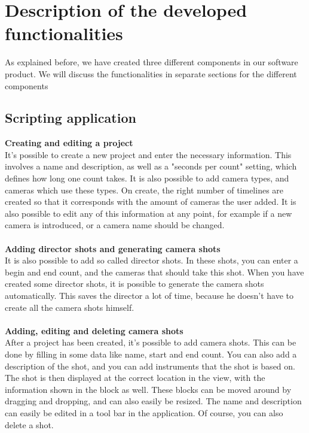 \section{Description of the developed functionalities}

As explained before, we have created three different components in our software product. We will discuss the functionalities in separate sections for the different components

\subsection{Scripting application}
\textbf{Creating and editing a project}\\
It's possible to create a new project and enter the necessary information. This involves a name and description, as well as a "seconds per count" setting, which defines how long one count takes. It is also possible to add camera types, and cameras which use these types. On create, the right number of timelines are created so that it corresponds with the amount of cameras the user added. It is also possible to edit any of this information at any point, for example if a new camera is introduced, or a camera name should be changed.\\\\
\textbf{Adding director shots and generating camera shots}\\
It is also possible to add so called director shots. In these shots, you can enter a begin and end count, and the cameras that should take this shot. When you have created some director shots, it is possible to generate the camera shots automatically. This saves the director a lot of time, because he doesn't have to create all the camera shots himself.\\\\
\textbf{Adding, editing and deleting camera shots}\\
After a project has been created, it's possible to add camera shots. This can be done by filling in some data like name, start and end count. You can also add a description of the shot, and you can add instruments that the shot is based on. The shot is then displayed at the correct location in the view, with the information shown in the block as well. These blocks can be moved around by dragging and dropping, and can also easily be resized. The name and description can easily be edited in a tool bar in the application. Of course, you can also delete a shot.\\\\
